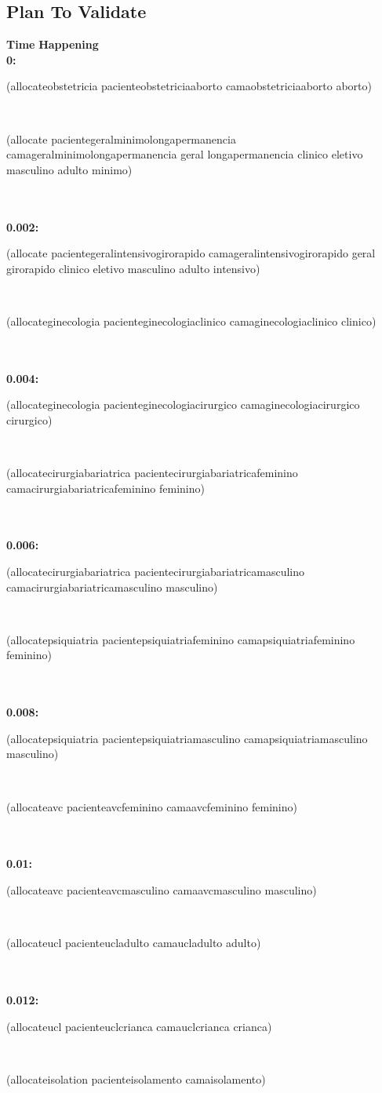 \documentclass[a4paper,12pt]{article}
\newcommand{\headingtimehappening}{{\bf Time} \qquad \= {\bf Happening}\\[0.8ex]}
\newcommand{\atime}[1]{{\bf #1:}}
\newcommand{\action}[1]{{\sf #1}}
\newcommand{\listrow}[1]{\begin{minipage}[t]{11.5cm} #1 \end{minipage}}
\begin{document}
\subsection{Plan To Validate}
\begin{tabbing}
\headingtimehappening 
\atime{0}  \> \listrow{\action{(allocateobstetricia pacienteobstetriciaaborto camaobstetriciaaborto aborto)}}\\ \> \listrow{\action{(allocate pacientegeralminimolongapermanencia camageralminimolongapermanencia geral longapermanencia clinico eletivo masculino adulto minimo)}}\\
\\\atime{0.002}  \> \listrow{\action{(allocate pacientegeralintensivogirorapido camageralintensivogirorapido geral girorapido clinico eletivo masculino adulto intensivo)}}\\ \> \listrow{\action{(allocateginecologia pacienteginecologiaclinico camaginecologiaclinico clinico)}}\\
\\\atime{0.004}  \> \listrow{\action{(allocateginecologia pacienteginecologiacirurgico camaginecologiacirurgico cirurgico)}}\\ \> \listrow{\action{(allocatecirurgiabariatrica pacientecirurgiabariatricafeminino camacirurgiabariatricafeminino feminino)}}\\
\\\atime{0.006}  \> \listrow{\action{(allocatecirurgiabariatrica pacientecirurgiabariatricamasculino camacirurgiabariatricamasculino masculino)}}\\ \> \listrow{\action{(allocatepsiquiatria pacientepsiquiatriafeminino camapsiquiatriafeminino feminino)}}\\
\\\atime{0.008}  \> \listrow{\action{(allocatepsiquiatria pacientepsiquiatriamasculino camapsiquiatriamasculino masculino)}}\\ \> \listrow{\action{(allocateavc pacienteavcfeminino camaavcfeminino feminino)}}\\
\\\atime{0.01}  \> \listrow{\action{(allocateavc pacienteavcmasculino camaavcmasculino masculino)}}\\ \> \listrow{\action{(allocateucl pacienteucladulto camaucladulto adulto)}}\\
\\\atime{0.012}  \> \listrow{\action{(allocateucl pacienteuclcrianca camauclcrianca crianca)}}\\ \> \listrow{\action{(allocateisolation pacienteisolamento camaisolamento)}}\\
\end{tabbing}
\end{document}
